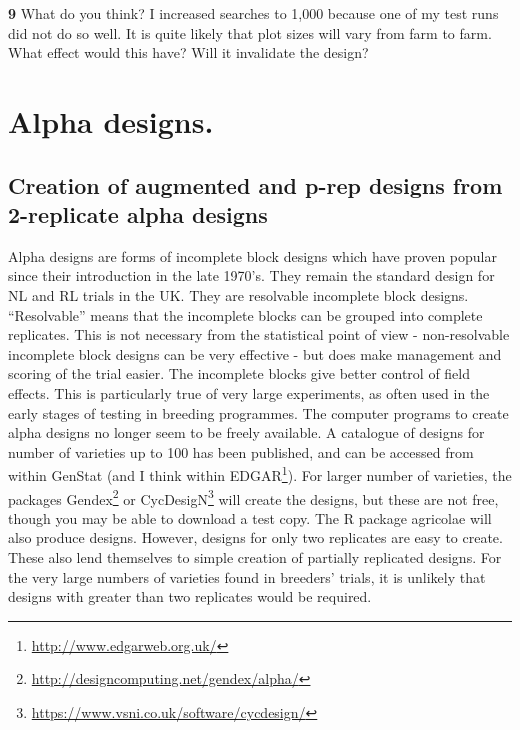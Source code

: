 \documentclass[
]{book}
\makeatletter
\renewcommand{\href}[2]{#2\footnote{\url{#1}}}
\newenvironment{kframe}{%
\medskip{}
\setlength{\fboxsep}{.8em}
 \def\at@end@of@kframe{}%
 \ifinner\ifhmode%
  \def\at@end@of@kframe{\end{minipage}}%
  \begin{minipage}{\columnwidth}%
 \fi\fi%
 \def\FrameCommand##1{\hskip\@totalleftmargin \hskip-\fboxsep
 \colorbox{shadecolor}{##1}\hskip-\fboxsep
     \hskip-\linewidth \hskip-\@totalleftmargin \hskip\columnwidth}%
 \MakeFramed {\advance\hsize-\width
   \@totalleftmargin\z@ \linewidth\hsize
   \@setminipage}}%
 {\par\unskip\endMakeFramed%
 \at@end@of@kframe}
\newenvironment{rmdblock}[1]
  {
  \begin{itemize}
  \renewcommand{\labelitemi}{
    \raisebox{-.7\height}[0pt][0pt]{
      {\setkeys{Gin}{width=3em,keepaspectratio}\texttt{[image: images/\#1]}}
    }
  }
  \setlength{\fboxsep}{1em}
  \begin{kframe}
  \item
  }
  {
  \end{kframe}
  \end{itemize}
  }
\newenvironment{rmdquiz}
  {\begin{rmdblock}{quiz}}
  {\end{rmdblock}}
\makeatother
\begin{document}
\begin{rmdquiz}
\textbf{9} What do you think? I increased searches to 1,000 because one of my test runs did not do so well. It is quite likely that plot sizes will vary from farm to farm. What effect would this have? Will it invalidate the design?
\end{rmdquiz}

\hypertarget{alpha-designs.}{%
\section{Alpha designs.}\label{alpha-designs.}}

\hypertarget{creation-of-augmented-and-p-rep-designs-from-2-replicate-alpha-designs}{%
\subsection{Creation of augmented and p-rep designs from 2-replicate alpha designs}\label{creation-of-augmented-and-p-rep-designs-from-2-replicate-alpha-designs}}

Alpha designs are forms of incomplete block designs which have proven popular since their introduction in the late 1970's. They remain the standard design for NL and RL trials in the UK. They are resolvable incomplete block designs. ``Resolvable'' means that the incomplete blocks can be grouped into complete replicates. This is not necessary from the statistical point of view - non-resolvable incomplete block designs can be very effective - but does make management and scoring of the trial easier. The incomplete blocks give better control of field effects. This is particularly true of very large experiments, as often used in the early stages of testing in breeding programmes. The computer programs to create alpha designs no longer seem to be freely available. A catalogue of designs for number of varieties up to 100 has been published, and can be accessed from within GenStat (and I think within \href{http://www.edgarweb.org.uk/}{EDGAR}). For larger number of varieties, the packages \href{http://designcomputing.net/gendex/alpha/}{Gendex} or
\href{https://www.vsni.co.uk/software/cycdesign/}{CycDesigN} will create the designs, but these are not free, though you may be able to download a test copy. The R package agricolae \citep{R-agricolae} will also produce designs. However, designs for only two replicates are easy to create. These also lend themselves to simple creation of partially replicated designs. For the very large numbers of varieties found in breeders' trials, it is unlikely that designs with greater than two replicates would be required.
\end{document}
